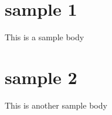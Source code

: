 \documentclass[11pt]{article}
\begin{document}
\section{sample 1}
This is a sample body

\section{sample 2}
This is another sample body


\end{document}
